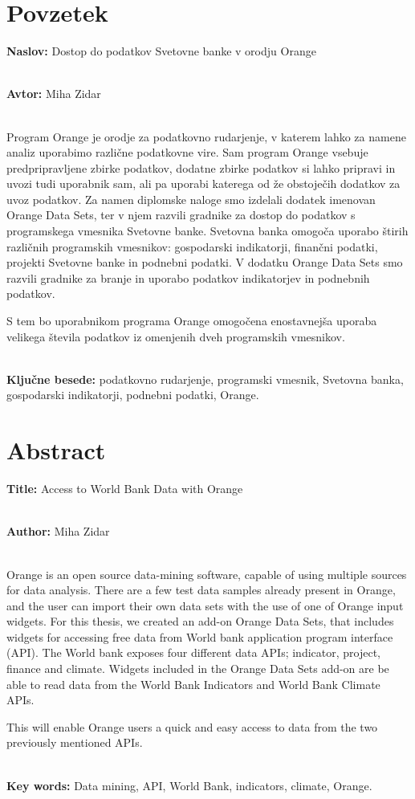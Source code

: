 \chapter*{Povzetek}


\textbf{Naslov:} Dostop do podatkov Svetovne banke v orodju Orange

\ \\
\textbf{Avtor:} Miha Zidar

\ \\
Program Orange je orodje za podatkovno rudarjenje, v katerem
lahko za namene analiz uporabimo različne podatkovne vire. Sam program Orange
vsebuje predpripravljene zbirke podatkov, dodatne zbirke podatkov si lahko 
pripravi in uvozi tudi uporabnik sam, ali pa uporabi katerega od že obstoječih
dodatkov za uvoz podatkov. Za namen diplomske naloge smo izdelali dodatek imenovan
Orange Data Sets, ter v njem razvili gradnike za dostop do podatkov s programskega 
vmesnika Svetovne banke. Svetovna banka omogoča uporabo štirih 
različnih programskih vmesnikov: gospodarski indikatorji, finančni podatki,
projekti Svetovne banke in podnebni podatki. V dodatku Orange Data Sets smo
razvili gradnike za branje in uporabo podatkov indikatorjev 
in podnebnih podatkov.

S tem bo uporabnikom programa Orange omogočena enostavnejša uporaba velikega števila
podatkov iz omenjenih dveh programskih vmesnikov.

\ \\
\textbf{Ključne besede:} podatkovno rudarjenje, programski vmesnik, 
Svetovna banka, gospodarski indikatorji, podnebni podatki, Orange. 




\clearemptydoublepage

\chapter*{Abstract}


\textbf{Title:} Access to World Bank Data with Orange

\ \\
\textbf{Author:} Miha Zidar

\ \\
Orange is an open source data-mining software, capable of using multiple sources for data analysis. There are a few test data samples already present in Orange, and the user can import their own data sets with the use of one of Orange input widgets. For this thesis, we created an add-on Orange Data Sets, that includes widgets for accessing free data from World bank application program interface (API). The World bank exposes four different data APIs; indicator, project, finance and climate. Widgets included in the Orange Data Sets add-on are be able to read data from the World Bank Indicators and World Bank Climate APIs.

This will enable Orange users a quick and easy access to data from the two previously mentioned APIs.

\ \\
\textbf{Key words:} Data mining, API, World Bank, indicators, climate, Orange.


